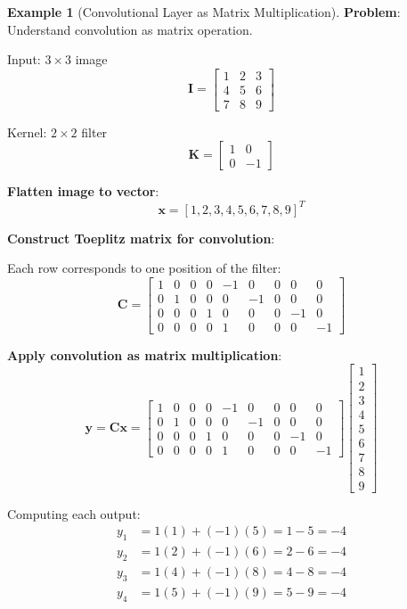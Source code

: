 \documentclass[12pt,a4paper]{article}
\theoremstyle{definition}
\newtheorem{example}{Example}[section]
\begin{document}
\begin{example}[Convolutional Layer as Matrix Multiplication]
\textbf{Problem}: Understand convolution as matrix operation.

Input: $3 \times 3$ image
\[
\mathbf{I} = \begin{bmatrix}
1 & 2 & 3 \\
4 & 5 & 6 \\
7 & 8 & 9
\end{bmatrix}
\]

Kernel: $2 \times 2$ filter
\[
\mathbf{K} = \begin{bmatrix}
1 & 0 \\
0 & -1
\end{bmatrix}
\]

\textbf{Flatten image to vector}:
\[
\mathbf{x} = [1, 2, 3, 4, 5, 6, 7, 8, 9]^T
\]

\textbf{Construct Toeplitz matrix for convolution}:

Each row corresponds to one position of the filter:
\[
\mathbf{C} = \begin{bmatrix}
1 & 0 & 0 & 0 & -1 & 0 & 0 & 0 & 0 \\
0 & 1 & 0 & 0 & 0 & -1 & 0 & 0 & 0 \\
0 & 0 & 0 & 1 & 0 & 0 & 0 & -1 & 0 \\
0 & 0 & 0 & 0 & 1 & 0 & 0 & 0 & -1
\end{bmatrix}
\]

\textbf{Apply convolution as matrix multiplication}:
\[
\mathbf{y} = \mathbf{C}\mathbf{x} = \begin{bmatrix}
1 & 0 & 0 & 0 & -1 & 0 & 0 & 0 & 0 \\
0 & 1 & 0 & 0 & 0 & -1 & 0 & 0 & 0 \\
0 & 0 & 0 & 1 & 0 & 0 & 0 & -1 & 0 \\
0 & 0 & 0 & 0 & 1 & 0 & 0 & 0 & -1
\end{bmatrix}
\begin{bmatrix}
1 \\ 2 \\ 3 \\ 4 \\ 5 \\ 6 \\ 7 \\ 8 \\ 9
\end{bmatrix}
\]

Computing each output:
\begin{align*}
y_1 &= 1(1) + (-1)(5) = 1 - 5 = -4 \\
y_2 &= 1(2) + (-1)(6) = 2 - 6 = -4 \\
y_3 &= 1(4) + (-1)(8) = 4 - 8 = -4 \\
y_4 &= 1(5) + (-1)(9) = 5 - 9 = -4
\end{align*}


\end{example}
\end{document}
